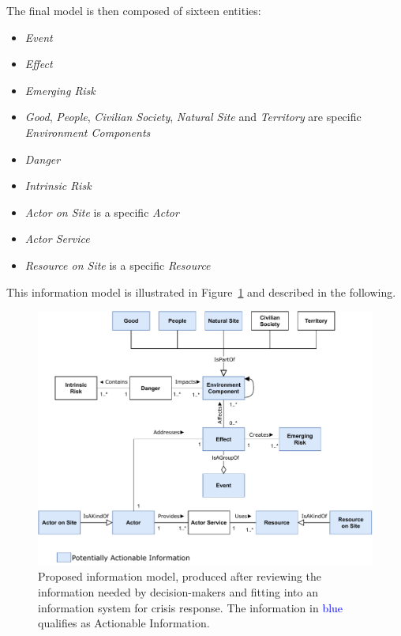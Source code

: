 The final model is then composed of sixteen entities:
\begin{itemize}
    \item \textit{Event}
    \item \textit{Effect}
    \item \textit{Emerging Risk}
    \item \textit{Good}, \textit{People}, \textit{Civilian Society}, \textit{Natural Site} and \textit{Territory} are specific \textit{Environment Components}
    \item \textit{Danger}
    \item \textit{Intrinsic Risk}
    \item \textit{Actor on Site} is a specific \textit{Actor}
    \item \textit{Actor Service}
    \item \textit{Resource on Site} is a specific \textit{Resource}
\end{itemize}

This information model is illustrated in Figure~\ref{information:information-models} and described in the following.

\begin{figure}[htb]
    \centering
    \includegraphics[width=\textwidth]{figures/chap-3/information-needs.pdf}
    \caption{Proposed information model, produced after reviewing the information needed by decision-makers and fitting into an information system for crisis response. The information in \textcolor{blue}{blue} qualifies as Actionable Information.}
    \label{information:information-models}
\end{figure}

